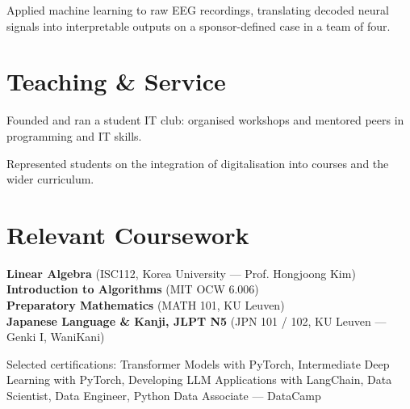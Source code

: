 \begin{bullets}
    \item Applied machine learning to raw EEG recordings, translating decoded neural signals into interpretable outputs on a sponsor-defined case in a team of four.
\end{bullets}

\section{Teaching \& Service}

\begin{bullets}
    \item Founded and ran a student IT club: organised workshops and mentored peers in programming and IT skills.
\end{bullets}

\begin{bullets}
    \item Represented students on the integration of digitalisation into courses and the wider curriculum.
\end{bullets}

\section{Relevant Coursework}

{\bodysize
\textbf{Linear Algebra} {\color{subtle}(ISC112, Korea University --- Prof. Hongjoong Kim)}\\[2pt]
\textbf{Introduction to Algorithms} {\color{subtle}(MIT OCW 6.006)}\\[2pt]
\textbf{Preparatory Mathematics} {\color{subtle}(MATH 101, KU Leuven)}\\[2pt]
\textbf{Japanese Language \& Kanji, JLPT N5} {\color{subtle}(JPN 101 / 102, KU Leuven --- Genki I, WaniKani)}
}

\vspace{4pt}
{\smallsize\color{subtle}Selected certifications: Transformer Models with PyTorch, Intermediate Deep Learning with PyTorch, Developing LLM Applications with LangChain, Data Scientist, Data Engineer, Python Data Associate --- DataCamp}

